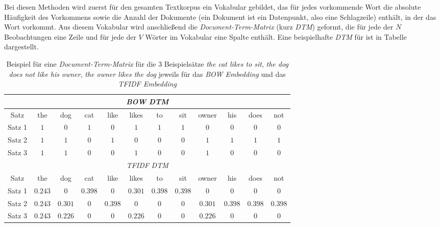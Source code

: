 \documentclass[a4paper,11pt]{article}
\begin{document}
Bei diesen Methoden wird zuerst für den gesamten Textkorpus ein Vokabular gebildet, das für jedes vorkommende Wort die absolute Häufigkeit des Vorkommens sowie die Anzahl der Dokumente (ein Dokument ist ein Datenpunkt, also eine Schlagzeile) enthält, in der das Wort vorkommt. Aus diesem Vokabular wird anschließend die \textit{Document-Term-Matrix} (kurz \textit{DTM}) geformt, die für jede der $N$ Beobachtungen eine Zeile und für jede der $V$ Wörter im Vokabular eine Spalte enthält. Eine beispielhafte \textit{DTM} für ist in Tabelle dargestellt.

\begin{table}[ht]
\begin{center}
    

\begin{tabular}{|c||ccccccccccc|}
\hline
\multicolumn{12}{|c|}{\textit{BOW} \textit{DTM}} \\
\hline 
   Satz   & the & dog & cat & like & likes &  to & sit  & owner & his &  does & not \\
      \hline
Satz 1 & $1$ & $0$ & $1$ & $0$ & $1$ & $1$ & $1$ & $0$ & $0$ &  $0$ & $0$ \\
Satz 2 & $1$ & $1$ & $0$ & $1$ & $0$ & $0$ & $0$ & $1$ & $1$ &  $1$ & $1$ \\
Satz 3 & $1$ & $1$ & $0$ & $0$ & $1$ & $0$ & $0$ & $1$ & $0$ &  $0$ & $0$ \\

\hline

\multicolumn{12}{|c|}{\textit{TFIDF} \textit{DTM}} \\
\hline 
   Satz   & the & dog & cat & like & likes &  to & sit  & owner & his &  does & not \\
      \hline
Satz 1 & $0.243$ & $0$ & $0.398$ & $0$ & $0.301$ & $0.398$ & $0.398$ & $0$ & $0$ &  $0$ & $0$ \\
Satz 2 & $0.243$ & $0.301$ & $0$ & $0.398$ & $0$ & $0$ & $0$ & $0.301$ & $0.398$ &  $0.398$ & $0.398$ \\
Satz 3 & $0.243$ & $0.226$ & $0$ & $0$ & $0.226$ & $0$ & $0$ & $0.226$ & $0$ & $0$ & $0$ \\
\hline
\end{tabular}
\end{center}{}
\caption{Beispiel für eine \textit{Document-Term-Matrix} für die $3$ Beispielsätze \textit{the cat likes to sit}, \textit{the dog does not like his owner}, \textit{the owner likes the dog} jeweils für das \textit{BOW Embedding} und das \textit{TFIDF Embedding} }  
\label{tab:BOWExample}

\end{table}
\end{document}
